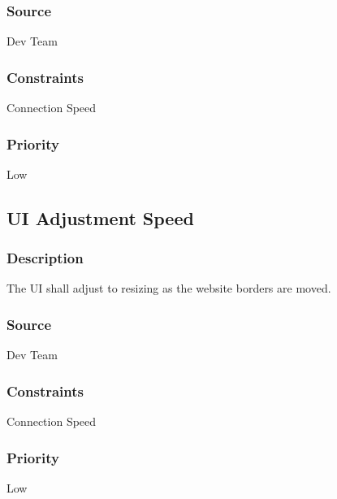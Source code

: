 \subsubsection{Source}
Dev Team
\subsubsection{Constraints}
Connection Speed
\subsubsection{Priority}
Low

\subsection{UI Adjustment Speed}
\subsubsection{Description}
The UI shall adjust to resizing as the website borders are moved.
\subsubsection{Source}
Dev Team
\subsubsection{Constraints}
Connection Speed
\subsubsection{Priority}
Low